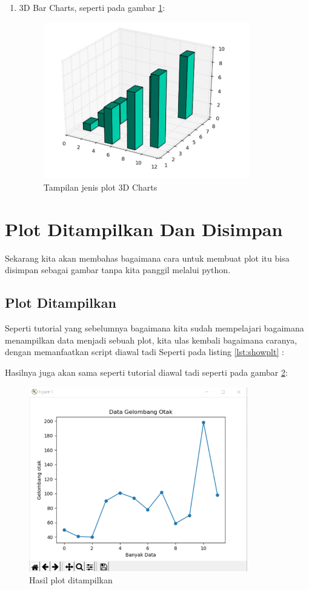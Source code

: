 \begin{enumerate}
\item 3D Bar Charts, seperti pada gambar \ref{fig:3dchart}:
\begin{figure}[!htbp]
	\centerline{\includegraphics[width=0.85\textwidth]{figures/6/3dchart.PNG}}
	\caption{Tampilan jenis plot 3D Charts}
	\label{fig:3dchart}
\end{figure}
\end{enumerate}

\section{Plot Ditampilkan Dan Disimpan}
Sekarang kita akan membahas bagaimana cara untuk membuat plot itu bisa disimpan sebagai gambar tanpa kita panggil melalui python.
\subsection{Plot Ditampilkan}
Seperti tutorial yang sebelumnya bagaimana kita sudah mempelajari bagaimana menampilkan data menjadi sebuah plot, kita ulas kembali bagaimana caranya, dengan memanfaatkan script diawal tadi Seperti pada listing \ref{lst:showplt} : 

Hasilnya juga akan sama seperti tutorial diawal tadi seperti pada gambar \ref{fig:hasilplot}:
\begin{figure}[!htbp]
	\centerline{\includegraphics[width=0.85\textwidth]{figures/6/hasilplot.PNG}}
	\caption{Hasil plot ditampilkan}
	\label{fig:hasilplot}
\end{figure} 

